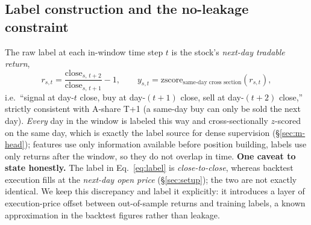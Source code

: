\documentclass[a4paper,11pt]{article}
\begin{document}
\subsection{Label construction and the no-leakage constraint}\label{sec:data-label}
The raw label at each in-window time step $t$ is the stock's
\emph{next-day tradable return},
\begin{equation}\label{eq:label}
r_{s,t} = \frac{\mathrm{close}_{s,\,t+2}}{\mathrm{close}_{s,\,t+1}} - 1,
\qquad y_{s,t}=\mathrm{zscore}_{\text{same-day cross section}}(r_{s,t}),
\end{equation}
i.e.\ ``signal at day-$t$ close, buy at day-$(t{+}1)$ close, sell at
day-$(t{+}2)$ close,'' strictly consistent with A-share T+1 (a same-day buy
can only be sold the next day). \emph{Every} day in the window is labeled this
way and cross-sectionally $z$-scored on the same day, which is exactly the
label source for dense supervision (\S\ref{sec:m-head}); features use only
information available before position building, labels use only returns after
the window, so they do not overlap in time. \textbf{One caveat to state
honestly.} The label in Eq.~\eqref{eq:label} is \emph{close-to-close}, whereas
backtest execution fills at the \emph{next-day open price} (\S\ref{sec:setup});
the two are not exactly identical. We keep this discrepancy and label it
explicitly: it introduces a layer of execution-price offset between
out-of-sample returns and training labels, a known approximation in the backtest
figures rather than leakage.
\end{document}
